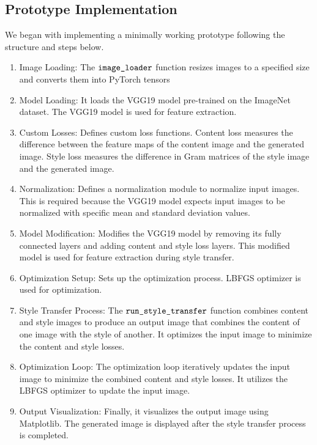 \documentclass[12pt]{article}
\begin{document}
\subsection{Prototype Implementation}
We began with implementing a minimally working prototype following the structure
and steps below.
\begin{enumerate}
    \item Image Loading: The $\verb|image_loader|$ function resizes images to a specified
    size and converts them into PyTorch tensors
    \item Model Loading: It loads the VGG19 model pre-trained on the ImageNet
    dataset. The VGG19 model is used for feature extraction. 
    \item Custom Losses: Defines custom loss functions. Content loss measures
    the difference between the feature maps of the content image and the
    generated image. Style loss measures the difference in Gram matrices of the
    style image and the generated image.
    \item Normalization: Defines a normalization module to normalize input
    images. This is required because the VGG19 model expects input images to be
    normalized with specific mean and standard deviation values.
    \item Model Modification: Modifies the VGG19 model by removing its fully
    connected layers and adding content and style loss layers. This modified
    model is used for feature extraction during style transfer.
    \item Optimization Setup: Sets up the optimization process. LBFGS optimizer
    is used for optimization.
    \item Style Transfer Process: The $\verb|run_style_transfer|$ function combines
    content and style images to produce an output image that combines the
    content of one image with the style of another. It optimizes the input image
    to minimize the content and style losses.
    \item Optimization Loop: The optimization loop iteratively updates the input
    image to minimize the combined content and style losses. It utilizes the
    LBFGS optimizer to update the input image.
    \item Output Visualization: Finally, it visualizes the output image using
    Matplotlib. The generated image is displayed after the style transfer
    process is completed.
\end{enumerate}
\end{document}
